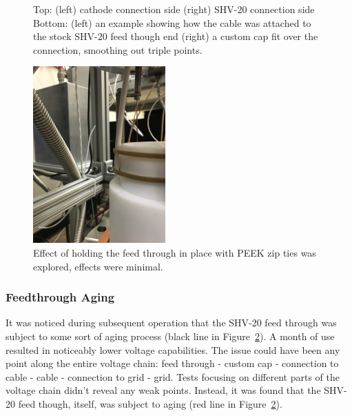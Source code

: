 \begin{figure}[htbp]
\begin{minipage}{0.4\textwidth}
    \end{minipage}
\caption{Top: (left) cathode connection side (right) SHV-20 connection side Bottom: (left) an example showing how the cable was attached to the stock SHV-20 feed though end (right) a custom cap fit over the connection, smoothing out triple points.}
 \label{fig:shv20}
\end{figure}

 \begin{figure}[htbp]
\begin{center}
\includegraphics[width=2in, angle=-90]{figures/testbed/ft3_5.jpg}
\caption{Effect of holding the feed through in place with PEEK zip ties was explored, effects were minimal.}
\label{fig:aging}
\end{center}
\end{figure}


 
\subsubsection{Feedthrough Aging}
\label{sec:aging}
It was noticed during subsequent operation that the SHV-20 feed through was subject to some sort of aging process (black line in Figure~\ref{fig:aging}). A month of use resulted in noticeably lower voltage capabilities. The issue could have been any point along the entire voltage chain: feed through - custom cap - connection to cable - cable - connection to grid - grid. Tests focusing on different parts of the voltage chain didn't reveal any weak points. Instead, it was found that the SHV-20 feed though, itself, was subject to aging (red line in Figure~\ref{fig:aging}). 



